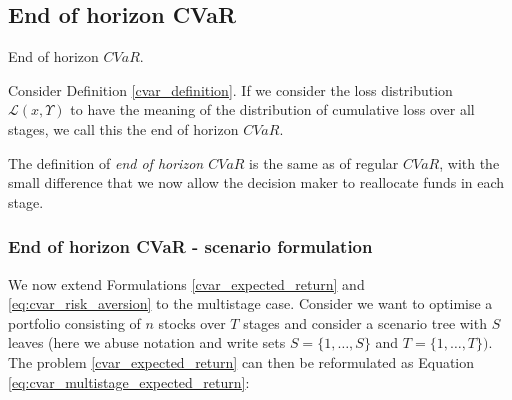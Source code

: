 \subsection{End of horizon CVaR}

\begin{defn}{End of horizon $CVaR$.}

Consider Definition \ref{cvar_definition}. If we consider the loss distribution $\mathcal{L}(x,\Upsilon)$ to have the meaning of the distribution of cumulative loss over all stages, we call this the end of horizon $CVaR$.
\end{defn}
The definition of \textit{end of horizon $CVaR$} is the same as of regular $CVaR$, with the small difference that we now allow the decision maker to reallocate funds in each stage. 

\subsubsection{End of horizon CVaR - scenario formulation}
We now extend Formulations \ref{cvar_expected_return} and \ref{eq:cvar_risk_aversion} to the multistage case. Consider we want to optimise a portfolio consisting of $n$ stocks over $T$ stages and consider a scenario tree with $S$ leaves (here we abuse notation and write sets $S=\{1,\dots,S\}$ and $T=\{1,\dots,T\})$. The problem \ref{cvar_expected_return} can then be reformulated as Equation \ref{eq:cvar_multistage_expected_return}:

